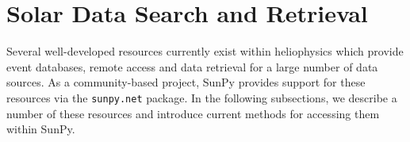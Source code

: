 \section{Solar Data Search and Retrieval}\label{sec:retrieval}

Several well-developed resources currently exist within heliophysics which provide event databases, 
remote access and data retrieval for a large number of data sources. As a community-based project, 
SunPy provides support for these resources via the \texttt{sunpy.net} package. 
In the following subsections, we describe a number of these resources and 
introduce current methods for accessing them within SunPy.






